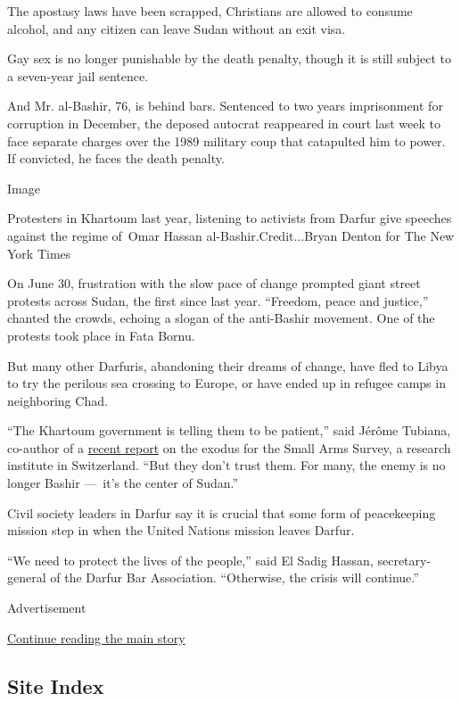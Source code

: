The apostasy laws have been scrapped, Christians are allowed to consume
alcohol, and any citizen can leave Sudan without an exit visa.

Gay sex is no longer punishable by the death penalty, though it is still
subject to a seven-year jail sentence.

And Mr. al-Bashir, 76, is behind bars. Sentenced to two years
imprisonment for corruption in December, the deposed autocrat reappeared
in court last week to face separate charges over the 1989 military coup
that catapulted him to power. If convicted, he faces the death penalty.

Image

Protesters in Khartoum last year, listening to activists from Darfur
give speeches against the regime of~Omar Hassan al-Bashir.Credit...Bryan
Denton for The New York Times

On June 30, frustration with the slow pace of change prompted giant
street protests across Sudan, the first since last year. ``Freedom,
peace and justice,'' chanted the crowds, echoing a slogan of the
anti-Bashir movement. One of the protests took place in Fata Bornu.

But many other Darfuris, abandoning their dreams of change, have fled to
Libya to try the perilous sea crossing to Europe, or have ended up in
refugee camps in neighboring Chad.

``The Khartoum government is telling them to be patient,'' said Jérôme
Tubiana, co-author of a
\href{http://www.smallarmssurveysudan.org/fileadmin/docs/reports/HSBA-Report-Darfur-mobility.pdf}{recent
report} on the exodus for the Small Arms Survey, a research institute in
Switzerland. ``But they don't trust them. For many, the enemy is no
longer Bashir ---~it's the center of Sudan.''

Civil society leaders in Darfur say it is crucial that some form of
peacekeeping mission step in when the United Nations mission leaves
Darfur.

``We need to protect the lives of the people,'' said El Sadig Hassan,
secretary-general of the Darfur Bar Association. ``Otherwise, the crisis
will continue.''

Advertisement

\protect\hyperlink{after-bottom}{Continue reading the main story}

\hypertarget{site-index}{%
\subsection{Site Index}\label{site-index}}

